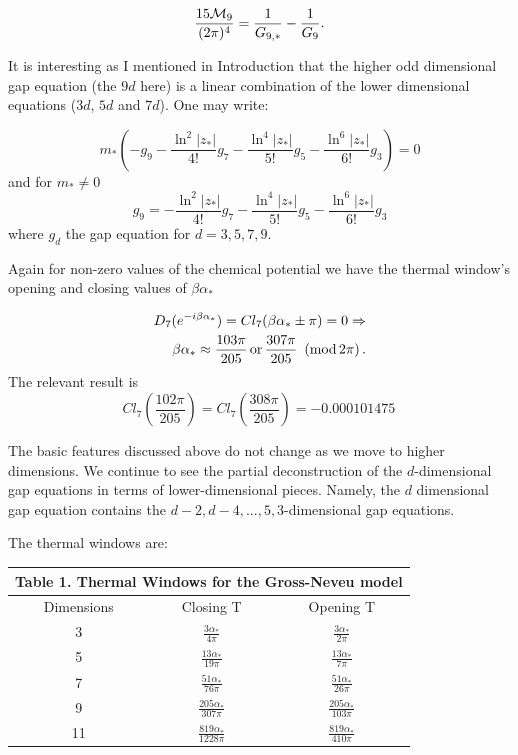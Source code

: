 \documentclass[twoside]{article}
\begin{document}
\begin{equation}
\frac{15{\cal M}_9}{(2\pi)^4}=\frac{1}{G_{9,*}}-\frac{1}{G_9}.
\end{equation}

It is interesting as I mentioned in Introduction that the higher odd dimensional gap equation (the $9d$ here) is a linear combination of the lower dimensional equations ($3d$, $5d$ and $7d$). One may write:

\begin{equation}
m_*(-g_9-\frac{\ln^2|z_*|}{4!}g_7
-\frac{\ln^4|z_*|}{5!}g_5-\frac{\ln^6|z_*|}{6!}g_3)=0
\end{equation}
and for $m_*\not=0$
\begin{equation}
\label{gaplinear9}
g_9=-\frac{\ln^2|z_*|}{4!}g_7
-\frac{\ln^4|z_*|}{5!}g_5-\frac{\ln^6|z_*|}{6!}g_3
\end{equation}
where $g_d$ the gap equation for $d=3,5,7,9$.


Again for non-zero values of the chemical potential we have the thermal window's opening and closing values of $\beta\alpha_*$

\begin{align}
\nonumber D_7(e^{-i\beta\alpha_*})=Cl_7(\beta\alpha_*\pm \pi)=0\Rightarrow \\
 \beta\alpha_*\approx \frac{103\pi}{205}\,{\rm or}\,\frac{307\pi}{205} \,\,\,({\rm mod}\,2\pi)\,.
\end{align}
The relevant result is 
\begin{equation}
Cl_7\left(\frac{102\pi}{205}\right)=Cl_7\left(\frac{308\pi}{205}\right)=-0.000101475\,
\end{equation}

The basic features discussed above do not change as we move to higher dimensions. We continue to see the partial deconstruction of the $d$-dimensional gap equations in terms of lower-dimensional pieces. Namely, the $d$ dimensional gap equation contains the $d-2, d-4,...,5,3$-dimensional gap equations.

The thermal windows are:\\
	
	{\centering
		\begin{tabular}{|c|c|c|}
			\hline 
			\multicolumn{3}{|c|}{\textbf{Table 1. Thermal Windows for the Gross-Neveu model}} \\ 
			\hline 
			Dimensions & Closing T & Opening T \\ 
                        \hline
                        3 & $\frac{3\alpha_*}{4\pi}$ & $\frac{3\alpha_*}{2\pi}$\\
			\hline 
			5 & $\frac{13\alpha_*}{19\pi}$ & $\frac{13\alpha_*}{7\pi}$ \\ 
			\hline 
			7 & $\frac{51\alpha_*}{76\pi}$ & $\frac{51\alpha_*}{26\pi}$ \\ 
			\hline 
			9 & $\frac{205\alpha_*}{307\pi}$ & $\frac{205\alpha_*}{103\pi}$ \\ 
			\hline 
			11 & $\frac{819\alpha_*}{1228\pi}$ & $\frac{819\alpha_*}{410\pi}$ \\ 
			\hline 
		\end{tabular}\par} 
\end{document}
